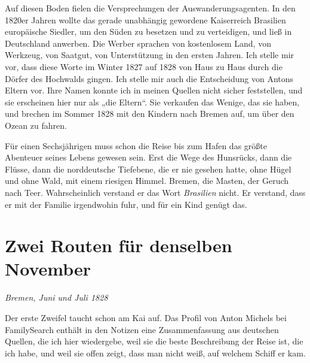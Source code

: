 \documentclass[
  ngerman,
  11pt,
  openany]{book}
\begin{document}
Auf diesen Boden fielen die Versprechungen der Auswanderungsagenten. In
den 1820er Jahren wollte das gerade unabhängig gewordene Kaiserreich
Brasilien europäische Siedler, um den Süden zu besetzen und zu
verteidigen, und ließ in Deutschland anwerben. Die Werber sprachen von
kostenlosem Land, von Werkzeug, von Saatgut, von Unterstützung in den
ersten Jahren. Ich stelle mir vor, dass diese Worte im Winter 1827 auf
1828 von Haus zu Haus durch die Dörfer des Hochwalds gingen. Ich stelle
mir auch die Entscheidung von Antons Eltern vor. Ihre Namen konnte ich
in meinen Quellen nicht sicher feststellen, und sie erscheinen hier nur
als „die Eltern``. Sie verkaufen das Wenige, das sie haben, und brechen
im Sommer 1828 mit den Kindern nach Bremen auf, um über den Ozean zu
fahren.

Für einen Sechsjährigen muss schon die Reise bis zum Hafen das größte
Abenteuer seines Lebens gewesen sein. Erst die Wege des Hunsrücks, dann
die Flüsse, dann die norddeutsche Tiefebene, die er nie gesehen hatte,
ohne Hügel und ohne Wald, mit einem riesigen Himmel. Bremen, die Masten,
der Geruch nach Teer. Wahrscheinlich verstand er das Wort
\emph{Brasilien} nicht. Er verstand, dass er mit der Familie irgendwohin
fuhr, und für ein Kind genügt das.

\section{Zwei Routen für denselben
November}\label{zwei-routen-fuxfcr-denselben-november}

\emph{Bremen, Juni und Juli 1828}

Der erste Zweifel taucht schon am Kai auf. Das Profil von Anton Michels
bei FamilySearch enthält in den Notizen eine Zusammenfassung aus
deutschen Quellen, die ich hier wiedergebe, weil sie die beste
Beschreibung der Reise ist, die ich habe, und weil sie offen zeigt, dass
man nicht weiß, auf welchem Schiff er kam.
\end{document}
